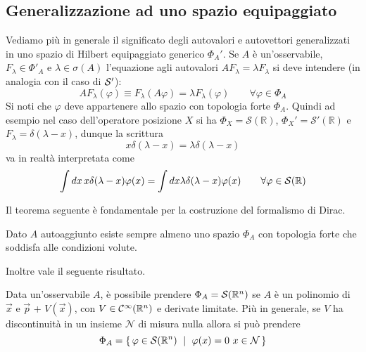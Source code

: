 \documentclass[../../FisicaTeorica.tex]{subfiles}
\begin{document}
\subsection{Generalizzazione ad uno spazio equipaggiato}
Vediamo più in generale il significato degli autovalori e autovettori generalizzati in uno spazio di Hilbert equipaggiato generico $\Phi_A'$. Se $A$ è un'osservabile, $F_\lambda \in \Phi'_A$ e $\lambda \in \sigma(A)$ l'equazione agli autovalori $A F_\lambda = \lambda F_\lambda$ si deve intendere (in analogia con il caso di $\mathcal S'$):
\[
A F_\lambda (\varphi) \equiv F_\lambda (A \varphi) = \lambda F_\lambda(\varphi) \qquad \forall \varphi \in \Phi_A
\]
Si noti che $\varphi$ deve appartenere allo spazio con topologia forte $\Phi_A$. Quindi ad esempio nel caso dell'operatore posizione $X$ si ha $\Phi_X = \mathcal S(\mathbb R)$, $\Phi_X' = \mathcal S'(\mathbb R)$ e $F_\lambda = \delta(\lambda - x)$, dunque la scrittura
\[
x \delta(\lambda - x) = \lambda \delta(\lambda - x)
\]
va in realtà interpretata come
\[
\int d x \, x \delta(\lambda - x) \varphi(x) = \int d x \lambda \delta(\lambda - x) \varphi(x) \qquad \forall \varphi \in \mathcal S(\mathbb R)
\]

Il teorema seguente è fondamentale per la costruzione del formalismo di Dirac.
\begin{thm}
Dato $A$ autoaggiunto esiste sempre almeno uno spazio $\Phi_A$ con topologia forte che soddisfa alle condizioni volute.
\end{thm}
Inoltre vale il seguente risultato.
\begin{thm}
Data un'osservabile $A$, è possibile prendere $\Phi_A = \mathcal S(\mathbb R^n)$ se $A$ è un polinomio di $\vec x$ e $\vec p$ + $V(\vec x)$, con $V \in {\mathcal C}^\infty(\mathbb R^n)$ e derivate limitate. Più in generale, se $V$ ha discontinuità in un insieme $\mathcal N$ di misura nulla allora si può prendere
\[
\Phi_A = \set{\varphi \in \mathcal S(\mathbb R^n) \,\, | \,\, \varphi(x) = 0 \,\, x \in \mathcal N}
\]
\end{thm}
\end{document}
